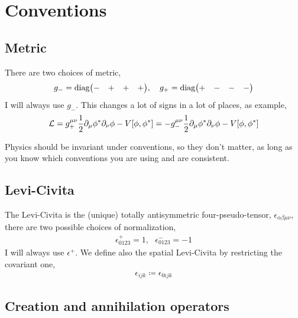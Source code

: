 \section{Conventions}

\subsection{Metric}

There are two choices of metric, 
\begin{align}
    g_-=\textnormal{diag}\mqty(-&+&+&+),\ \ \ g_+=\textnormal{diag}\mqty(+&-&-&-)
\end{align}
I will always use $g_-$. This changes a lot of signs in a lot of places, as example,
\begin{align}
    \mathcal L = g_+^{\mu\nu}\frac12\partial_\mu \phi^\ast\partial_\nu\phi-V\qty[\phi,\phi^\ast]= -g_-^{\mu\nu}\frac12\partial_\mu \phi^\ast\partial_\nu\phi-V\qty[\phi,\phi^\ast]
\end{align}

Physics should be invariant under conventions, so they don't matter, as long as you know which conventions 
you are using and are consistent.

\subsection{Levi-Civita}

The Levi-Civita is the (unique) totally antisymmetric four-pseudo-tensor, $\epsilon_{\alpha\beta\mu\nu}$, there are two possible 
choices of normalization,
\begin{align}
    \epsilon^+_{0123}=1,\ \ \ \epsilon^-_{0123}=-1
\end{align}
I will always use $\epsilon^+$. We define also the spatial Levi-Civita by restricting the covariant one,
\begin{align}
    \epsilon_{ijk} \coloneq \epsilon_{0ijk}
\end{align}

\subsection{Creation and annihilation operators}

